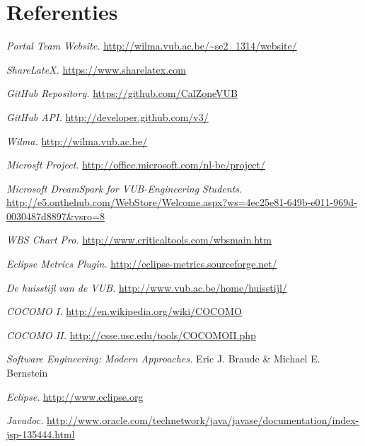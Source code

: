 \chapter{Referenties}
\begingroup
\renewcommand{\chapter}[2]{}%
\begin{thebibliography}{99}

     \emph{Portal Team Website.} \url{http://wilma.vub.ac.be/~se2_1314/website/}
    
     \emph{ShareLateX.} \url{https://www.sharelatex.com}
    
     \emph{GitHub Repository.} \url{https://github.com/CalZoneVUB}
    
     \emph{GitHub API.} \url{http://developer.github.com/v3/}
    
     \emph{Wilma.} \url{http://wilma.vub.ac.be/}
    
     \emph{Microsft Project.} \url{http://office.microsoft.com/nl-be/project/}
    
     \emph{Microsoft DreamSpark for VUB-Engineering Students.} \url{http://e5.onthehub.com/WebStore/Welcome.aspx?ws=4ec25e81-649b-e011-969d-0030487d8897&vsro=8}
    
     \emph{WBS Chart Pro.} \url{http://www.criticaltools.com/wbsmain.htm}
    
     \emph{Eclipse Metrics Plugin.} \url{http://eclipse-metrics.sourceforge.net/}
    
     \emph{De huisstijl van de VUB.} \url{http://www.vub.ac.be/home/huisstijl/}

	 \emph{COCOMO I.} \url{http://en.wikipedia.org/wiki/COCOMO}
	
	 \emph{COCOMO II.} \url{http://csse.usc.edu/tools/COCOMOII.php}
	
	 \emph{Software Engineering: Modern Approaches.} Eric J. Braude \& Michael E. Bernstein

     \emph{Eclipse.} \url{http://www.eclipse.org}
    
     \emph{Javadoc.} \url{http://www.oracle.com/technetwork/java/javase/documentation/index-jsp-135444.html}


\end{thebibliography}
